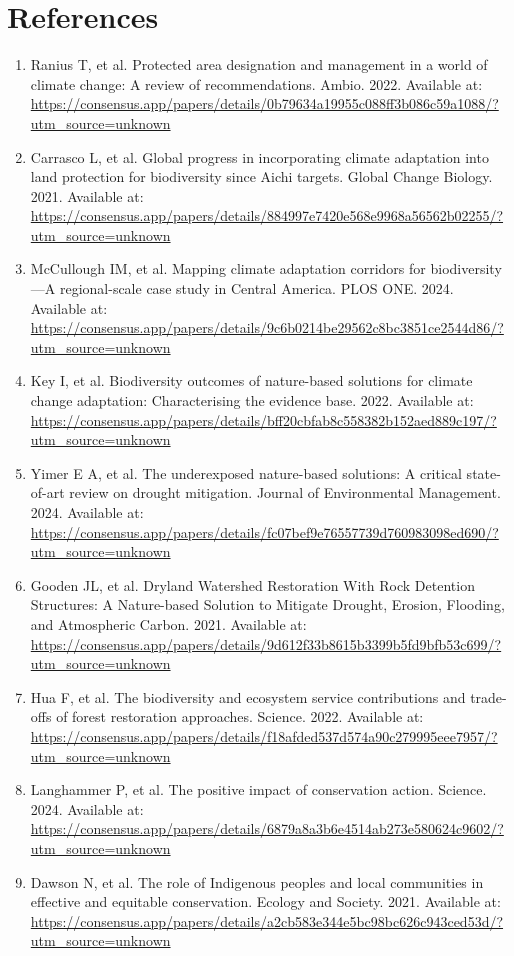 \documentclass[11pt]{article}
\begin{document}
\section{References}
\begin{enumerate}
\item Ranius T, et al. Protected area designation and management in a world of climate change: A review of recommendations. Ambio. 2022. Available at: \url{https://consensus.app/papers/details/0b79634a19955c088ff3b086c59a1088/?utm_source=unknown}
\item Carrasco L, et al. Global progress in incorporating climate adaptation into land protection for biodiversity since Aichi targets. Global Change Biology. 2021. Available at: \url{https://consensus.app/papers/details/884997e7420e568e9968a56562b02255/?utm_source=unknown}
\item McCullough IM, et al. Mapping climate adaptation corridors for biodiversity---A regional-scale case study in Central America. PLOS ONE. 2024. Available at: \url{https://consensus.app/papers/details/9c6b0214be29562c8bc3851ce2544d86/?utm_source=unknown}
\item Key I, et al. Biodiversity outcomes of nature-based solutions for climate change adaptation: Characterising the evidence base. 2022. Available at: \url{https://consensus.app/papers/details/bff20cbfab8c558382b152aed889c197/?utm_source=unknown}
\item Yimer E A, et al. The underexposed nature-based solutions: A critical state-of-art review on drought mitigation. Journal of Environmental Management. 2024. Available at: \url{https://consensus.app/papers/details/fc07bef9e76557739d760983098ed690/?utm_source=unknown}
\item Gooden JL, et al. Dryland Watershed Restoration With Rock Detention Structures: A Nature-based Solution to Mitigate Drought, Erosion, Flooding, and Atmospheric Carbon. 2021. Available at: \url{https://consensus.app/papers/details/9d612f33b8615b3399b5fd9bfb53c699/?utm_source=unknown}
\item Hua F, et al. The biodiversity and ecosystem service contributions and trade-offs of forest restoration approaches. Science. 2022. Available at: \url{https://consensus.app/papers/details/f18afded537d574a90c279995eee7957/?utm_source=unknown}
\item Langhammer P, et al. The positive impact of conservation action. Science. 2024. Available at: \url{https://consensus.app/papers/details/6879a8a3b6e4514ab273e580624c9602/?utm_source=unknown}
\item Dawson N, et al. The role of Indigenous peoples and local communities in effective and equitable conservation. Ecology and Society. 2021. Available at: \url{https://consensus.app/papers/details/a2cb583e344e5bc98bc626c943ced53d/?utm_source=unknown}

\end{enumerate}
\end{document}
